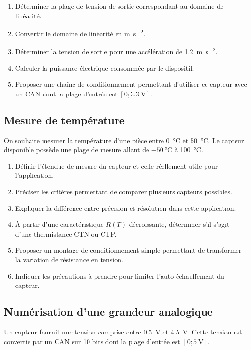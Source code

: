 \begin{enumerate}
  \item Déterminer la plage de tension de sortie correspondant au domaine de linéarité.
  \item Convertir le domaine de linéarité en \si{\metre\per\second\squared}.
  \item Déterminer la tension de sortie pour une accélération de \SI{1.2}{\metre\per\second\squared}.
  \item Calculer la puissance électrique consommée par le dispositif.
  \item Proposer une chaîne de conditionnement permettant d'utiliser ce capteur avec un CAN dont la plage d'entrée est $[0;\SI{3.3}{\volt}]$.
\end{enumerate}

\subsection{Mesure de température}

On souhaite mesurer la température d'une pièce entre \SI{0}{\degreeCelsius} et \SI{50}{\degreeCelsius}. Le capteur disponible possède une plage de mesure allant de $-\SI{50}{\degreeCelsius}$ à \SI{100}{\degreeCelsius}.

\begin{enumerate}
  \item Définir l'étendue de mesure du capteur et celle réellement utile pour l'application.
  \item Préciser les critères permettant de comparer plusieurs capteurs possibles.
  \item Expliquer la différence entre précision et résolution dans cette application.
  \item À partir d'une caractéristique $R(T)$ décroissante, déterminer s'il s'agit d'une thermistance CTN ou CTP.
  \item Proposer un montage de conditionnement simple permettant de transformer la variation de résistance en tension.
  \item Indiquer les précautions à prendre pour limiter l'auto-échauffement du capteur.
\end{enumerate}

\subsection{Numérisation d'une grandeur analogique}

Un capteur fournit une tension comprise entre \SI{0.5}{\volt} et \SI{4.5}{\volt}. Cette tension est convertie par un CAN sur 10 bits dont la plage d'entrée est $[0;\SI{5}{\volt}]$.

